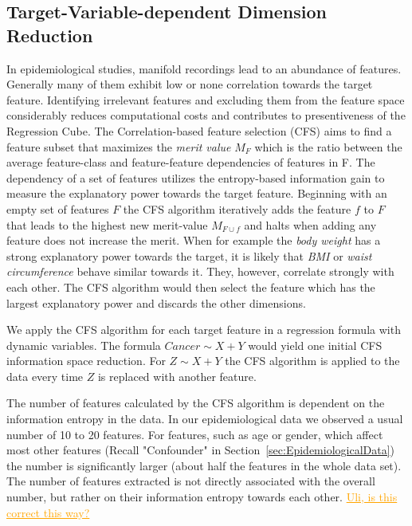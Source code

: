 \documentclass[journal]{style/vgtc} 			          %
\newcommand{\com}[1]{\textcolor{orange}{\uline{#1}}}
\begin{document}
\subsection{Target-Variable-dependent Dimension Reduction}
In epidemiological studies, manifold recordings lead to an abundance of features.
Generally many of them exhibit low or none correlation towards the target feature.
Identifying irrelevant features and excluding them from the feature space considerably reduces computational costs and contributes to presentiveness of the Regression Cube.
The Correlation-based feature selection (CFS) \cite{CFS} aims to find a feature subset that maximizes the \emph{merit value} $M_F$ which is the ratio between the average feature-class and feature-feature dependencies of features in F.
The dependency of a set of features utilizes the entropy-based information gain to measure the explanatory power towards the target feature.
Beginning with an empty set of features $F$ the CFS algorithm iteratively adds the feature $f$ to $F$ that leads to the highest new merit-value $M_{F\cup f}$ and halts when adding any feature does not increase the merit.
When for example the \emph{body weight} has a strong explanatory power towards the target, it is likely that \emph{BMI} or \emph{waist circumference} behave similar towards it.
They, however, correlate strongly with each other.
The CFS algorithm would then select the feature which has the largest explanatory power and discards the other dimensions.

We apply the CFS algorithm for each target feature in a regression formula with dynamic variables.
The formula $Cancer \sim X + Y$ would yield one initial CFS information space reduction.
For $Z \sim X + Y$ the CFS algorithm is applied to the data every time $Z$ is replaced with another feature.

The number of features calculated by the CFS algorithm is dependent on the information entropy in the data.
In our epidemiological data we observed a usual number of 10 to 20 features.
For features, such as age or gender, which affect most other features (Recall "Confounder" in Section~\ref{sec:EpidemiologicalData}) the number is significantly larger (about half the features in the whole data set).
The number of features extracted is not directly associated with the overall number, but rather on their information entropy towards each other.
\com{Uli, is this correct this way?}
\end{document}
